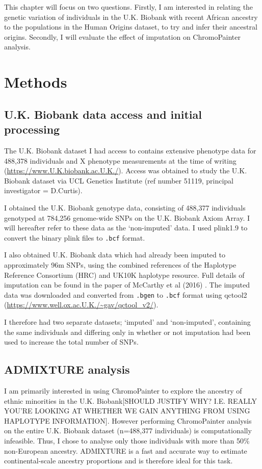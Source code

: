 This chapter will focus on two questions. Firstly, I am interested in relating the genetic variation of individuals in the U.K. Biobank with recent African ancestry to the populations in the Human Origins dataset, to try and infer their ancestral origins. Secondly, I will evaluate the effect of imputation on ChromoPainter analysis. 


\section{Methods}

\subsection{U.K. Biobank data access and initial processing}

The U.K. Biobank dataset I had access to contains extensive phenotype data for 488,378 individuals and X phenotype measurements at the time of writing (\url{https://www.U.K.biobank.ac.U.K./}). Access was obtained to study the U.K. Biobank dataset via UCL Genetics Institute (ref number 51119, principal investigator = D.Curtis). 

I obtained the U.K. Biobank genotype data, consisting of 488,377 individuals genotyped at 784,256 genome-wide SNPs on the U.K. Biobank Axiom Array. I will hereafter refer to these data as the `non-imputed' data. I used plink1.9 \cite{purcell2007plink} to convert the binary plink files to \texttt{.bcf} format. 

I also obtained U.K. Biobank data which had already been imputed to approximately 96m SNPs, using the combined references of the Haplotype Reference Consortium (HRC) and UK10K haplotype resource. Full details of imputation can be found in the paper of McCarthy et al (2016) \cite{mccarthy2016reference}. The imputed data was downloaded and converted from \texttt{.bgen} to \texttt{.bcf} format using qctool2 (\url{https://www.well.ox.ac.U.K./~gav/qctool_v2/}). 

I therefore had two separate datasets; `imputed' and `non-imputed', containing the same individuals and differing only in whether or not imputation had been used to increase the total number of SNPs.

\subsection{ADMIXTURE analysis}

I am primarily interested in using ChromoPainter \cite{Lawson2012} to explore the ancestry of ethnic minorities in the U.K. Biobank{\color{red}[SHOULD JUSTIFY WHY? I.E. REALLY YOU'RE LOOKING AT WHETHER WE GAIN ANYTHING FROM USING HAPLOTYPE INFORMATION]}. However performing ChromoPainter analysis on the entire U.K. Biobank dataset (n=488,377 individuals) is computationally infeasible. Thus, I chose to analyse only those individuals with more than 50\% non-European ancestry. ADMIXTURE is a fast and accurate way to estimate continental-scale ancestry proportions \cite{alexander2009fast} and is therefore ideal for this task. 

